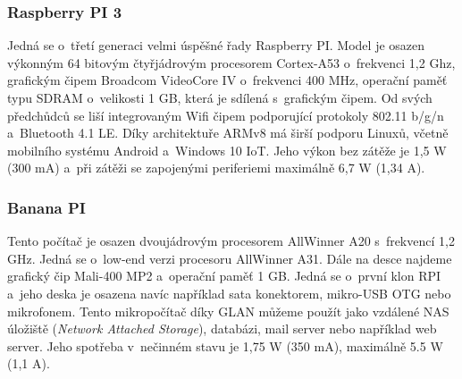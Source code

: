 \subsubsection*{Raspberry PI 3}
Jedná se o~třetí generaci velmi úspěšné řady Raspberry PI. Model je osazen výkonným 64 bitovým čtyřjádrovým procesorem Cortex-A53 o~frekvenci 1,2 Ghz, grafickým čipem Broadcom VideoCore IV o~frekvenci 400 MHz, operační paměť typu SDRAM o~velikosti 1 GB, která je sdílená s~grafickým čipem. Od svých předchůdců se liší integrovaným Wifi čipem podporující protokoly 802.11 b/g/n a~Bluetooth 4.1 LE. Díky architektuře ARMv8 má širší podporu Linuxů, včetně mobilního systému Android a~Windows 10 IoT. Jeho výkon bez zátěže je 1,5 W (300 mA) a~při zátěži se zapojenými periferiemi maximálně 6,7 W (1,34 A).

\subsubsection*{Banana PI}
Tento počítač je osazen dvoujádrovým procesorem AllWinner A20 s~frekvencí 1,2 GHz. Jedná se o~low-end verzi procesoru AllWinner A31. Dále na desce najdeme grafický čip Mali-400 MP2 a~operační paměť 1 GB. Jedná se o~první klon RPI a~jeho deska je osazena navíc například sata konektorem, mikro-USB OTG nebo mikrofonem. Tento mikropočítač díky GLAN můžeme použít jako vzdálené NAS úložiště (\textit{Network Attached Storage}), databázi, mail server nebo například web server. Jeho spotřeba v~nečinném stavu je 1,75 W (350 mA), maximálně 5.5 W (1,1 A).

